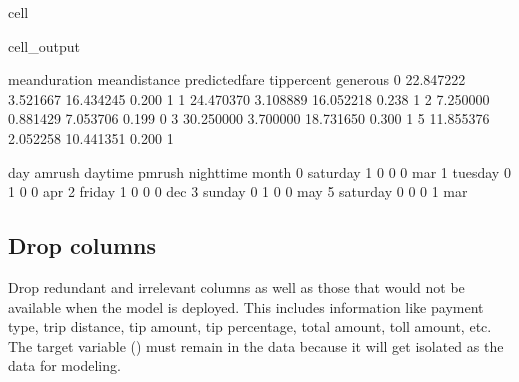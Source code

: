 \documentclass[letterpaper,10pt,english]{sphinxmanual}
\begin{document}
\begin{sphinxuseclass}{cell}
\begin{sphinxuseclass}{cell_output}
\begin{sphinxVerbatim}[commandchars=\\\{\}]
   mean\PYGZus{}duration  mean\PYGZus{}distance  predicted\PYGZus{}fare  tip\PYGZus{}percent  generous  \PYGZbs{}
0      22.847222       3.521667       16.434245        0.200         1   
1      24.470370       3.108889       16.052218        0.238         1   
2       7.250000       0.881429        7.053706        0.199         0   
3      30.250000       3.700000       18.731650        0.300         1   
5      11.855376       2.052258       10.441351        0.200         1   

        day  am\PYGZus{}rush  daytime  pm\PYGZus{}rush  nighttime month  
0  saturday        1        0        0          0   mar  
1   tuesday        0        1        0          0   apr  
2    friday        1        0        0          0   dec  
3    sunday        0        1        0          0   may  
5  saturday        0        0        0          1   mar  
\end{sphinxVerbatim}

\end{sphinxuseclass}
\end{sphinxuseclass}

\subsection{Drop columns}
\label{\detokenize{Automatidata_Machine Learning:drop-columns}}
\sphinxAtStartPar
Drop redundant and irrelevant columns as well as those that would not be available when the model is deployed. This includes information like payment type, trip distance, tip amount, tip percentage, total amount, toll amount, etc. The target variable () must remain in the data because it will get isolated as the  data for modeling.
\end{document}
